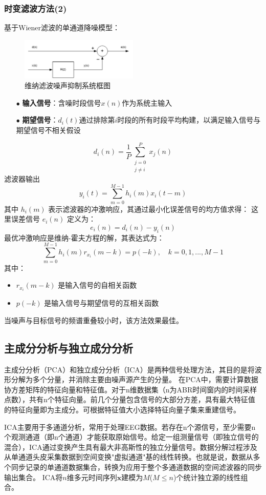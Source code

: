 \subsubsection{时变滤波方法(2)}
基于Wiener滤波的单通道降噪模型：
\begin{figure}[H]
  \centering
  \includegraphics[width=0.5\textwidth]{images/wienerfiltering.png}
  \caption{维纳滤波噪声抑制系统框图}
  \label{fig:InterleavedFrequencies}
\end{figure}
\begin{itemize}
\item[$\bullet$] \textbf{输入信号}：含噪时段信号$x(n)$作为系统主输入
\item[$\bullet$] \textbf{期望信号}：$d_i(t)$通过排除第$i$时段的所有时段平均构建，以满足输入信号与期望信号不相关假设
\end{itemize}
\[ 
d_i(n) = \frac{1}{P} \sum_{\substack{j=0 \\ j \neq i}}^{P} x_j(n) 
\]
滤波器输出
\[ y_i(t) = \sum_{m=0}^{M-1} h_i(m)x_i(t-m) \]
其中 $h_i(m)$ 表示滤波器的冲激响应，其通过最小化误差信号的均方值求得：
这里误差信号 $e_i(n)$ 定义为：
\[
e_i(n) = d_i(n) - y_i(n)
\]
最优冲激响应是维纳-霍夫方程的解，其表达式为：
\[
\sum_{m=0}^{M-1} h_i(m) r_{x_i}(m-k) = p(-k), \quad k = 0,1,...,M-1
\]
其中：
\begin{itemize}
\item $r_{x_i}(m-k)$ 是输入信号的自相关函数
\item $p(-k)$ 是输入信号与期望信号的互相关函数
\end{itemize}

当噪声与目标信号的频谱重叠较小时，该方法效果最佳。
\subsection*{主成分分析与独立成分分析}
主成分分析（PCA）和独立成分分析（ICA）是两种信号处理方法，其目的是将波形分解为多个分量，并消除主要由噪声源产生的分量。
在PCA中，需要计算数据协方差矩阵的特征向量和特征值。对于n维数据集（n为ABR时间窗内的时间采样点数），共有n个特征向量。前几个分量包含信号的大部分方差，具有最大特征值的特征向量即为主成分。可根据特征值大小选择特征向量子集来重建信号。

ICA主要用于多通道分析，常用于处理EEG数据。若存在n个源信号，至少需要n个观测通道（即n个通道）才能获取原始信号。给定一组测量信号（即独立信号的混合），ICA通过变换产生具有最大非高斯性的独立分量信号。数据分解过程涉及从单通道头皮采集数据到空间变换"虚拟通道"基的线性转换。也就是说，数据从多个同步记录的单通道数据集合，转换为应用于整个多通道数据的空间滤波器的同步输出集合。
ICA将$n$维多元时间序列$\mathbf{x}$建模为$M$($M \leq n$)个统计独立源的线性组合。


